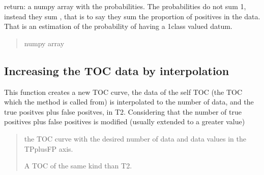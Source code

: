 \documentclass[letterpaper,10pt,english]{sphinxmanual}
\begin{document}
\begin{fulllineitems}
\sphinxAtStartPar
return: a numpy array with the probabilities. The probabilities do not sum 1, instead they sum , that is to say they sum the proportion of positives in the data. That is an estimation of the probability of having a 1\sphinxhyphen{}class valued datum.
\begin{quote}\begin{description}
\sphinxAtStartPar
numpy array

\end{description}\end{quote}

\end{fulllineitems}



\subsection{Increasing the TOC data by interpolation}
\label{\detokenize{usage:increasing-the-toc-data-by-interpolation}}

\begin{fulllineitems}
\label{\detokenize{usage:ootoc.TOC.resample}}
\pysigstartsignatures
{}
\pysigstopsignatures
\sphinxAtStartPar
This function creates a new TOC curve,  the data of the self TOC (the TOC which the method is called from)
is interpolated to the number of data, and the true positves plus false positves,   in T2.
Considering that the number of true positives plus false positives is modified (usually extended to a greater value)
\begin{quote}\begin{description}
\sphinxAtStartPar
{} \textendash{} the TOC curve with the desired number of data and data values in the TPplusFP axis.

\sphinxAtStartPar
A TOC of the same kind than T2.

\sphinxAtStartPar
{\hyperref[\detokenize{usage:ootoc.TOC}]{}}

\end{description}\end{quote}

\end{fulllineitems}
\end{document}
